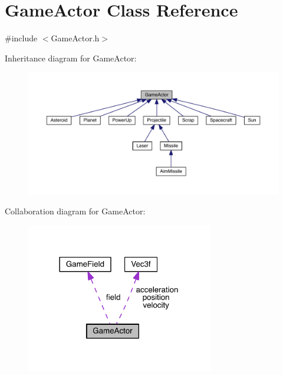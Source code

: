 \hypertarget{class_game_actor}{\section{Game\+Actor Class Reference}
\label{class_game_actor}
}


{\ttfamily \#include $<$Game\+Actor.\+h$>$}



Inheritance diagram for Game\+Actor\+:\nopagebreak
\begin{figure}[H]
\begin{center}
\leavevmode
\includegraphics[width=350pt]{class_game_actor__inherit__graph}
\end{center}
\end{figure}


Collaboration diagram for Game\+Actor\+:\nopagebreak
\begin{figure}[H]
\begin{center}
\leavevmode
\includegraphics[width=231pt]{class_game_actor__coll__graph}
\end{center}
\end{figure}
